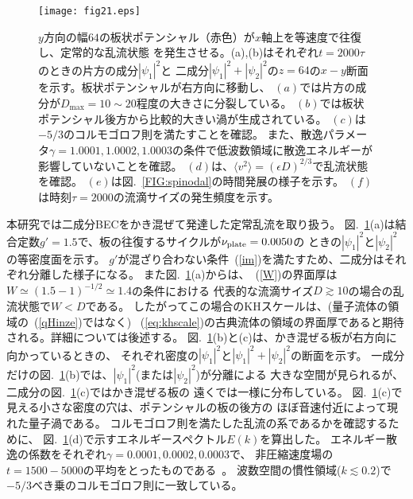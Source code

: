 \documentclass[12pt,a4paper]{jbook}
\begin{document}
		\begin{figure}[H]
			\begin{center}
			\texttt{[image: fig21.eps]}
			\caption{
				$y$方向の幅$64$の板状ポテンシャル（赤色）が$x$軸上を等速度で往復し、定常的な乱流状態
				を発生させる。(a),(b)はそれぞれ$t=2000 \tau$のときの片方の成分$|\psi_1|^2$と
				二成分$|\psi_1|^2+|\psi_2|^2$の$z=64$の$x-y$断面を示す。板状ポテンシャルが右方向に移動し、
				$(a)$では片方の成分が$D_{\textrm{max}}=10 \sim 20$程度の大きさに分裂している。
				$(b)$では板状ポテンシャル後方から比較的大きい渦が生成されている。
				$(c)$は$-5/3$のコルモゴロフ則を満たすことを確認。
				また、散逸パラメータ$\gamma=1.0001, 1.0002, 1.0003$の条件で低波数領域に散逸エネルギーが影響していないことを確認。
				$(d)$は、$\langle v^2 \rangle = \left( \epsilon D \right)^{2/3}$で乱流状態を確認。
				$(e)$は図.~\ref{FIG:spinodal}の時間発展の様子を示す。
				$(f)$は時刻$\tau=2000$の流滴サイズの発生頻度を示す。
			}
			\label{FIG:setup}
			\end{center}
        \end{figure}
        本研究では二成分BECをかき混ぜて発達した定常乱流を取り扱う。
        図.~\ref{FIG:setup}(a)は結合定数$g'=1.5$で、板の往復するサイクルが$\nu_{\rm plate}=0.0050$の
        ときの$|\psi_1|^2$と$|\psi_2|^2$の等密度面を示す。
        $g'$が混ざり合わない条件~(\ref{im})を満たすため、二成分はそれぞれ分離した様子になる。
        また図.~\ref{FIG:setup}(a)からは、~(\ref{W})の界面厚は$W \simeq (1.5 - 1)^{-1/2} \simeq 1.4$の条件における
        代表的な流滴サイズ$D \gtrsim 10$の場合の乱流状態で$W < D$である。
        したがってこの場合のKHスケールは、(量子流体の領域の~(\ref{qHinze})ではなく)
        ~(\ref{eq:khscale})の古典流体の領域の界面厚であると期待される。詳細については後述する。
        図.~\ref{FIG:setup}(b)と(c)は、かき混ぜる板が右方向に向かっているときの、
        それぞれ密度の$|\psi_1|^2$と$|\psi_1|^2 + |\psi_2|^2$の断面を示す。
        一成分だけの図.~\ref{FIG:setup}(b)では、$|\psi_1|^2$(または$|\psi_2|^2$)が分離による
        大きな空間が見られるが、二成分の図.~\ref{FIG:setup}(c)ではかき混ぜる板の
        遠くでは一様に分布している。
        図.~\ref{FIG:setup}(c)で見える小さな密度の穴は、ポテンシャルの板の後方の
        ほぼ音速付近によって現れた量子渦である。
        コルモゴロフ則を満たした乱流の系であるかを確認するために、
        図.~\ref{FIG:setup}(d)で示すエネルギースペクトル$E(k)$を算出した。
        エネルギー散逸の係数をそれぞれ$\gamma=0.0001, 0.0002, 0.0003$で、
        非圧縮速度場の$t=1500-5000$の平均をとったものである~\cite{Nore}。
        波数空間の慣性領域($k \lesssim 0.2$)で$-5/3$べき乗のコルモゴロフ則に一致している。
\end{document}
